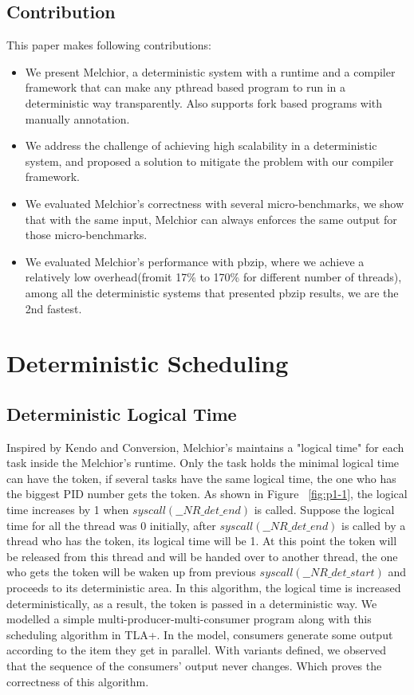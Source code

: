 \documentclass{sig-alternate}
\begin{document}
\subsection{Contribution}
This paper makes following contributions:

\begin{itemize}
  \item We present Melchior, a deterministic system with a runtime and a compiler framework that can make any pthread based program to run in a deterministic way transparently. Also supports fork based programs with manually annotation.
  \item We address the challenge of achieving high scalability in a deterministic system, and proposed a solution to mitigate the problem with our compiler framework.
  \item We evaluated Melchior's correctness with several micro-benchmarks, we show that with the same input, Melchior can always enforces the same output for those micro-benchmarks.
  \item We evaluated Melchior's performance with pbzip, where we achieve a relatively low overhead(fromit 17\% to 170\% for different number of threads), among all the deterministic systems that presented pbzip results, we are the 2nd fastest.
\end{itemize} 

\section{Deterministic Scheduling}
\subsection{Deterministic Logical Time}
Inspired by Kendo\cite{olszewski2009kendo} and Conversion\cite{merrifieldincreasing}, Melchior's maintains a "logical time" for each task inside the Melchior's runtime. Only the task holds the minimal logical time can have the token, if several tasks have the same logical time, the one who has the biggest PID number gets the token. As shown in Figure ~\ref{fig:p1-1}, the logical time increases by 1 when $syscall(\_\_NR\_det\_end)$ is called. Suppose the logical time for all the thread was 0 initially, after $syscall(\_\_NR\_det\_end)$ is called by a thread who has the token, its logical time will be 1. At this point the token will be released from this thread and will be handed over to another thread, the one who gets the token will be waken up from previous $syscall(\_\_NR\_det\_start)$ and proceeds to its deterministic area. In this algorithm, the logical time is increased deterministically, as a result, the token is passed in a deterministic way. We modelled a simple multi-producer-multi-consumer program along with this scheduling algorithm in TLA+. In the model,  consumers generate some output according to the item they get in parallel. With variants defined, we observed that the sequence of the consumers' output never changes. Which proves the correctness of this algorithm.
\end{document}
